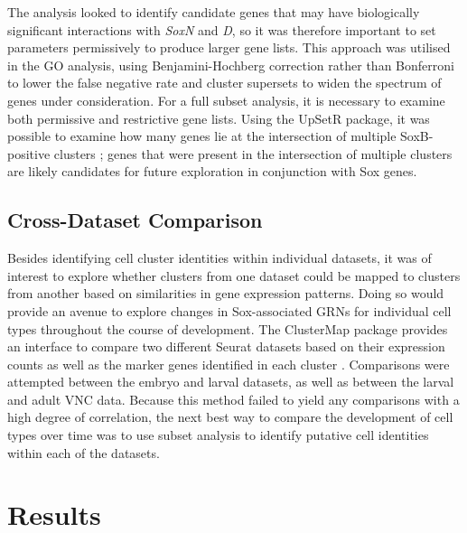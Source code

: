 \documentclass[withindex,glossary]{cam-thesis}
\begin{document}
The analysis looked to identify candidate genes that may have
biologically significant interactions with \emph{SoxN} and \emph{D}, so
it was therefore important to set parameters permissively to produce
larger gene lists. This approach was utilised in the GO analysis, using
Benjamini-Hochberg correction rather than Bonferroni to lower the false
negative rate and cluster supersets to widen the spectrum of genes under
consideration. For a full subset analysis, it is necessary to examine
both permissive and restrictive gene lists. Using the UpSetR package, it
was possible to examine how many genes lie at the intersection of
multiple SoxB-positive clusters ; genes that were
present in the intersection of multiple clusters are likely candidates
for future exploration in conjunction with Sox genes.

\subsection{Cross-Dataset Comparison}

Besides identifying cell cluster identities within individual datasets,
it was of interest to explore whether clusters from one dataset could be
mapped to clusters from another based on similarities in gene expression
patterns. Doing so would provide an avenue to explore changes in
Sox-associated GRNs for individual cell types throughout the course of
development. The ClusterMap package provides an interface to compare two
different Seurat datasets based on their expression counts as well as
the marker genes identified in each cluster .
Comparisons were attempted between the embryo and larval datasets, as
well as between the larval and adult VNC data. Because this method
failed to yield any comparisons with a high degree of correlation, the
next best way to compare the development of cell types over time was to
use subset analysis to identify putative cell identities within each of
the datasets.

\section{Results}
\end{document}
